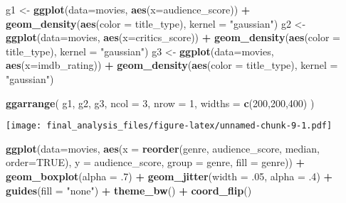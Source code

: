 \documentclass[]{article}
\newenvironment{Shaded}{\begin{snugshade}}{\end{snugshade}}
\newcommand{\DataTypeTok}[1]{\textcolor[rgb]{0.13,0.29,0.53}{#1}}
\newcommand{\DecValTok}[1]{\textcolor[rgb]{0.00,0.00,0.81}{#1}}
\newcommand{\FloatTok}[1]{\textcolor[rgb]{0.00,0.00,0.81}{#1}}
\newcommand{\KeywordTok}[1]{\textcolor[rgb]{0.13,0.29,0.53}{\textbf{#1}}}
\newcommand{\NormalTok}[1]{#1}
\newcommand{\OperatorTok}[1]{\textcolor[rgb]{0.81,0.36,0.00}{\textbf{#1}}}
\newcommand{\OtherTok}[1]{\textcolor[rgb]{0.56,0.35,0.01}{#1}}
\newcommand{\StringTok}[1]{\textcolor[rgb]{0.31,0.60,0.02}{#1}}
\begin{document}
\begin{Shaded}
\begin{Highlighting}[]
\NormalTok{g1 <-}\StringTok{ }\KeywordTok{ggplot}\NormalTok{(}\DataTypeTok{data=}\NormalTok{movies, }\KeywordTok{aes}\NormalTok{(}\DataTypeTok{x=}\NormalTok{audience_score)) }\OperatorTok{+}\StringTok{ }\KeywordTok{geom_density}\NormalTok{(}\KeywordTok{aes}\NormalTok{(}\DataTypeTok{color =}\NormalTok{ title_type), }\DataTypeTok{kernel =} \StringTok{"gaussian"}\NormalTok{)}
\NormalTok{g2 <-}\StringTok{ }\KeywordTok{ggplot}\NormalTok{(}\DataTypeTok{data=}\NormalTok{movies, }\KeywordTok{aes}\NormalTok{(}\DataTypeTok{x=}\NormalTok{critics_score)) }\OperatorTok{+}\StringTok{ }\KeywordTok{geom_density}\NormalTok{(}\KeywordTok{aes}\NormalTok{(}\DataTypeTok{color =}\NormalTok{ title_type), }\DataTypeTok{kernel =} \StringTok{"gaussian"}\NormalTok{)}
\NormalTok{g3 <-}\StringTok{ }\KeywordTok{ggplot}\NormalTok{(}\DataTypeTok{data=}\NormalTok{movies, }\KeywordTok{aes}\NormalTok{(}\DataTypeTok{x=}\NormalTok{imdb_rating)) }\OperatorTok{+}\StringTok{ }\KeywordTok{geom_density}\NormalTok{(}\KeywordTok{aes}\NormalTok{(}\DataTypeTok{color =}\NormalTok{ title_type), }\DataTypeTok{kernel =} \StringTok{"gaussian"}\NormalTok{)}

\KeywordTok{ggarrange}\NormalTok{(}
\NormalTok{    g1,}
\NormalTok{    g2,}
\NormalTok{    g3,}
    \DataTypeTok{ncol =} \DecValTok{3}\NormalTok{,}
    \DataTypeTok{nrow =} \DecValTok{1}\NormalTok{,}
    \DataTypeTok{widths =} \KeywordTok{c}\NormalTok{(}\DecValTok{200}\NormalTok{,}\DecValTok{200}\NormalTok{,}\DecValTok{400}\NormalTok{)}
\NormalTok{  )}
\end{Highlighting}
\end{Shaded}

\texttt{[image: final\_analysis\_files/figure-latex/unnamed-chunk-9-1.pdf]}

\begin{Shaded}
\begin{Highlighting}[]
\KeywordTok{ggplot}\NormalTok{(}\DataTypeTok{data=}\NormalTok{movies, }\KeywordTok{aes}\NormalTok{(}\DataTypeTok{x =} \KeywordTok{reorder}\NormalTok{(genre, audience_score, median, }\DataTypeTok{order=}\OtherTok{TRUE}\NormalTok{), }\DataTypeTok{y =}\NormalTok{ audience_score, }\DataTypeTok{group =}\NormalTok{ genre, }\DataTypeTok{fill =}\NormalTok{ genre)) }\OperatorTok{+}\StringTok{ }\KeywordTok{geom_boxplot}\NormalTok{(}\DataTypeTok{alpha =} \FloatTok{.7}\NormalTok{) }\OperatorTok{+}\StringTok{ }\KeywordTok{geom_jitter}\NormalTok{(}\DataTypeTok{width =} \FloatTok{.05}\NormalTok{, }\DataTypeTok{alpha =} \FloatTok{.4}\NormalTok{) }\OperatorTok{+}\StringTok{ }\KeywordTok{guides}\NormalTok{(}\DataTypeTok{fill =} \StringTok{"none"}\NormalTok{) }\OperatorTok{+}\StringTok{ }\KeywordTok{theme_bw}\NormalTok{() }\OperatorTok{+}\StringTok{ }\KeywordTok{coord_flip}\NormalTok{()}
\end{Highlighting}
\end{Shaded}
\end{document}
